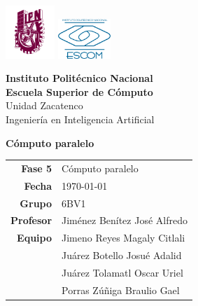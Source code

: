 \begin{titlepage}
	\centering
	\includegraphics[height=2cm]{logo/Logo_IPN.png}
	\hfill
	\raisebox{0.25\height}
	{\includegraphics[height=1.5cm]{logo/escudoESCOM.png}}

	\vspace{-1.5cm}
	\large\textbf{Instituto Politécnico Nacional}\\
	\large\textbf{Escuela Superior de Cómputo}\\
	\large{Unidad Zacatenco}\\
	\vspace{0.5cm}
	\large{{Ingeniería en Inteligencia Artificial}}
	\vspace{2cm}


	\Large{\textbf{Cómputo paralelo}}

	\vspace{8cm}

	\begin{tabular}{rl}
		\textbf{Fase 5}  & Cómputo paralelo
		                   \\
		\textbf{Fecha} & \today \\
		\textbf{Grupo}    & 6BV1                        \\
		\textbf{Profesor} & Jiménez Benítez José Alfredo \\
		\textbf{Equipo}   
		& Jimeno Reyes Magaly Citlali \\
		& Juárez Botello Josué Adalid \\
		& Juárez Tolamatl Oscar Uriel \\
		& Porras Zúñiga Braulio Gael \\
	\end{tabular}
\end{titlepage}
